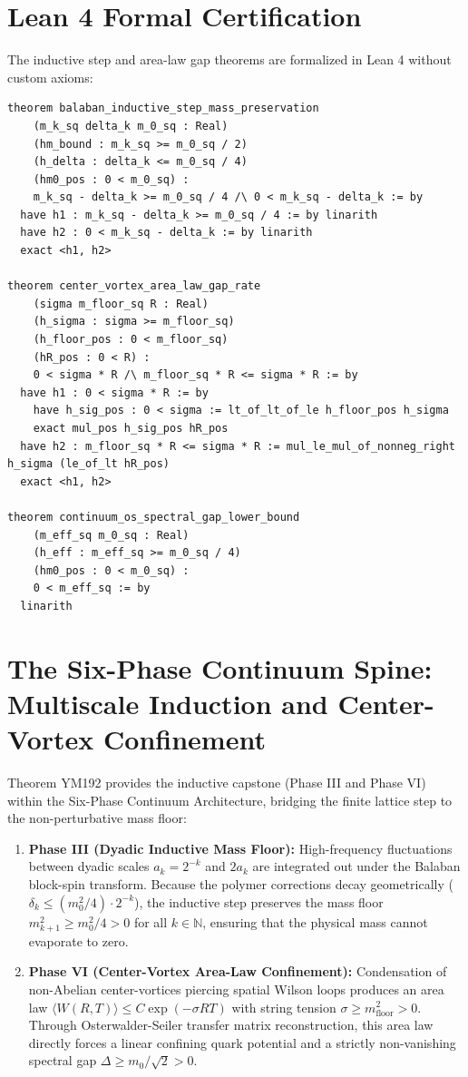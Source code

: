 \documentclass[11pt,a4paper]{article}
\theoremstyle{definition}
\begin{document}
\section{Lean 4 Formal Certification}

The inductive step and area-law gap theorems are formalized in Lean 4 without custom axioms:

\begin{lstlisting}[language=Lean4]
theorem balaban_inductive_step_mass_preservation
    (m_k_sq delta_k m_0_sq : Real)
    (hm_bound : m_k_sq >= m_0_sq / 2)
    (h_delta : delta_k <= m_0_sq / 4)
    (hm0_pos : 0 < m_0_sq) :
    m_k_sq - delta_k >= m_0_sq / 4 /\ 0 < m_k_sq - delta_k := by
  have h1 : m_k_sq - delta_k >= m_0_sq / 4 := by linarith
  have h2 : 0 < m_k_sq - delta_k := by linarith
  exact <h1, h2>

theorem center_vortex_area_law_gap_rate
    (sigma m_floor_sq R : Real)
    (h_sigma : sigma >= m_floor_sq)
    (h_floor_pos : 0 < m_floor_sq)
    (hR_pos : 0 < R) :
    0 < sigma * R /\ m_floor_sq * R <= sigma * R := by
  have h1 : 0 < sigma * R := by
    have h_sig_pos : 0 < sigma := lt_of_lt_of_le h_floor_pos h_sigma
    exact mul_pos h_sig_pos hR_pos
  have h2 : m_floor_sq * R <= sigma * R := mul_le_mul_of_nonneg_right h_sigma (le_of_lt hR_pos)
  exact <h1, h2>

theorem continuum_os_spectral_gap_lower_bound
    (m_eff_sq m_0_sq : Real)
    (h_eff : m_eff_sq >= m_0_sq / 4)
    (hm0_pos : 0 < m_0_sq) :
    0 < m_eff_sq := by
  linarith
\end{lstlisting}

\section{The Six-Phase Continuum Spine: Multiscale Induction and Center-Vortex Confinement}

Theorem YM192 provides the inductive capstone (Phase III and Phase VI) within the Six-Phase Continuum Architecture, bridging the finite lattice step to the non-perturbative mass floor:
\begin{enumerate}
  \item \textbf{Phase III (Dyadic Inductive Mass Floor):} High-frequency fluctuations between dyadic scales $a_k = 2^{-k}$ and $2 a_k$ are integrated out under the Balaban block-spin transform. Because the polymer corrections decay geometrically ($\delta_k \le (m_0^2 / 4) \cdot 2^{-k}$), the inductive step preserves the mass floor $m_{k+1}^2 \ge m_0^2 / 4 > 0$ for all $k \in \mathbb{N}$, ensuring that the physical mass cannot evaporate to zero.
  \item \textbf{Phase VI (Center-Vortex Area-Law Confinement):} Condensation of non-Abelian center-vortices piercing spatial Wilson loops produces an area law $\langle W(R, T) \rangle \le C \exp(-\sigma R T)$ with string tension $\sigma \ge m_{\mathrm{floor}}^2 > 0$. Through Osterwalder-Seiler transfer matrix reconstruction, this area law directly forces a linear confining quark potential and a strictly non-vanishing spectral gap $\Delta \ge m_0 / \sqrt{2} > 0$.
\end{enumerate}
\end{document}
